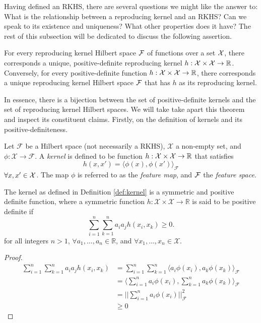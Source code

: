 Having defined an RKHS, there are several questions we might like the answer to: What is the relationship between a reproducing kernel and an RKHS? Can we speak to its existence and uniqueness? What other properties does it have?
The rest of this subsection will be dedicated to discuss the following assertion.

\begin{theorem}[RKHS]
  For every reproducing kernel Hilbert space ${\mathcal F}$ of functions over a set ${\mathcal X}$, there corresponds a unique, positive-definite reproducing kernel $h:{\mathcal X}\times{\mathcal X}\to\mathbb{R}$.
  Conversely, for every positive-definite function $h:{\mathcal X}\times{\mathcal X}\to\mathbb{R}$, there corresponds a unique reproducing kernel Hilbert space ${\mathcal F}$ that has $h$ as its reproducing kernel.
\end{theorem}

In essence, there is a bijection between the set of positive-definite kernels and the set of reproducing kernel Hilbert spaces.
We will take take apart this theorem and inspect its constituent claims.
Firstly, on the definition of kernels and its positive-definiteness.

\begin{definition}[Kernels]\label{def:kernel}
  Let $\mathcal F$ be a Hilbert space (not necessarily a RKHS), $\mathcal X$ a non-empty set, and $\phi:\mathcal X \rightarrow \mathcal F$.   
  A \emph{kernel} is defined to be function $h:{\mathcal X}\times{\mathcal X}\to\mathbb{R}$ that satisfies
  \[
    h(x,x') = \langle \phi(x), \phi(x') \rangle_{\mathcal F}
  \]
  $\forall x,x'\in{\mathcal X}$.
  The map $\phi$ is referred to as the \emph{feature map}, and ${\mathcal F}$ the \emph{feature space}.
\end{definition}

\begin{lemma}\label{thm:posdef}
  The kernel as defined in Definition \ref{def:kernel} is a symmetric and positive definite function, where a symmetric function $h:\mathcal X\times\mathcal X\rightarrow\mathbb R$ is said to be  positive definite if
  \[
    \sum_{i=1}^n\sum_{k=1}^n a_ia_jh(x_i, x_k) \geq 0.
  \]
  for all integers $n>1$, $\forall a_1, \dots, a_n \in \mathbb R$, and $\forall x_1, \dots, x_n \in \mathcal X$.
\end{lemma}

\begin{proof}
  \begin{align*}
    \sum_{i=1}^n\sum_{k=1}^n a_ia_jh(x_i, x_k)	
    &= \sum_{i=1}^n\sum_{k=1}^n \langle a_i\phi(x_i), a_k\phi(x_k) \rangle_{\mathcal F} \\
    &= \Bigg\langle \sum_{i=1}^n a_i\phi(x_i), \sum_{k=1}^n a_k\phi(x_k) \Bigg\rangle_{\mathcal F} \\
    &= \Bigg|\Bigg| \sum_{i=1}^n a_i\phi(x_i) \Bigg|\Bigg|_{\mathcal F}^2 \\
    & \geq 0
  \end{align*}
\end{proof}

